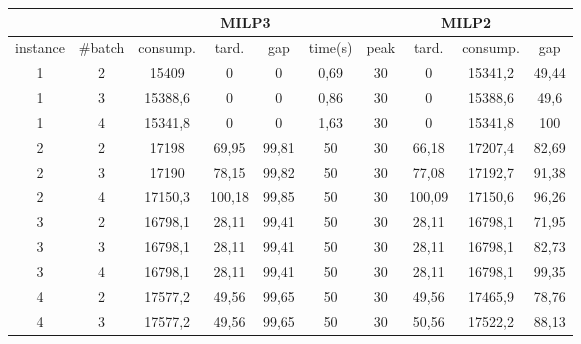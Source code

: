 \begin{table}[!ht]
\small
    \hspace{2cm}
    \begin{tabular}{|c|c|cccc|cccc|}
      \hline 
      & & \multicolumn{4}{|c|}{MILP3}&
                                                        \multicolumn{4}{|c|}{MILP2}\\ 
      \hline 
      instance & \#batch & consump. & tard. & gap & time(s) &
      peak & tard.  & consump. & gap\\ 
      \hline
\rule[-7pt]{0pt}{15pt}  
      1	&	2	&	15409	&	0	&	0
                         &	0,69	&	30	&	0
                                                  &	15341,2	&
                                                                  49,44
      \\
\rule[-7pt]{0pt}{15pt} 
1	&	3	&	15388,6	&	0	&	0
                         &	0,86	&	30	&	0
                                                  &	15388,6	&
                                                                  49,6
      \\
\rule[-7pt]{0pt}{15pt} 
1	&	4	&	15341,8	&	0	&	0
                         &	1,63	&	30	&	0
                                                  &	15341,8	&
                                                                  100
      \\
      \hline
\rule[-7pt]{0pt}{15pt} 
2	&	2	&	17198	&	69,95	&	99,81
                         &	50	&	30	&	66,18
                                                  &	17207,4	&
                                                                  82,69
      \\
\rule[-7pt]{0pt}{15pt} 
2	&	3	&	17190	&	78,15	&	99,82	&	50	&	30	&	77,08	&	17192,7	&	91,38	\\
\rule[-7pt]{0pt}{15pt} 
2	&	4	&	17150,3	&	100,18	&	99,85	&	50	&	30	&	100,09	&	17150,6	&	96,26	\\
      \hline
\rule[-7pt]{0pt}{15pt} 
3	&	2	&	16798,1	&	28,11	&	99,41	&	50	&	30	&	28,11	&	16798,1	&	71,95	\\
\rule[-7pt]{0pt}{15pt} 
3	&	3	&	16798,1	&	28,11	&	99,41	&	50	&	30	&	28,11	&	16798,1	&	82,73	\\
\rule[-7pt]{0pt}{15pt} 
3	&	4	&	16798,1	&	28,11	&	99,41	&	50	&	30	&	28,11	&	16798,1	&	99,35	\\
      \hline
\rule[-7pt]{0pt}{15pt} 
4	&	2	&	17577,2	&	49,56	&	99,65	&	50	&	30	&	49,56	&	17465,9	&	78,76	\\
\rule[-7pt]{0pt}{15pt} 
4	&	3	&	17577,2	&	49,56	&	99,65	&	50	&	30	&	50,56	&	17522,2	&	88,13	\\

\end{tabular}
\end{table}
